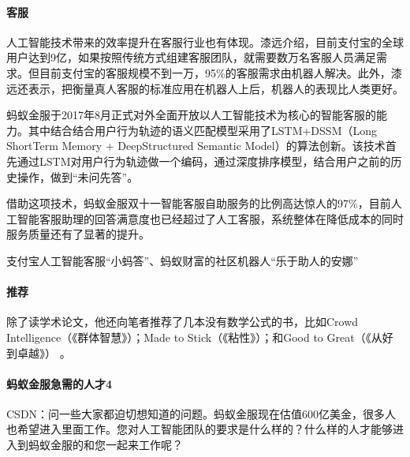\documentclass[letterpaper,11pt,english]{sphinxmanual}
\begin{document}
\paragraph{客服}
\label{\detokenize{chapter_AI_dive/qi_yuan:id6}}
人工智能技术带来的效率提升在客服行业也有体现。漆远介绍，目前支付宝的全球用户达到9亿，如果按照传统方式组建客服团队，就需要数万名客服人员满足需求。但目前支付宝的客服规模不到一万，95\%的客服需求由机器人解决。此外，漆远还表示，把衡量真人客服的标准应用在机器人上后，机器人的表现比人类更好。

蚂蚁金服于2017年8月正式对外全面开放以人工智能技术为核心的智能客服的能力。其中结合结合用户行为轨迹的语义匹配模型采用了LSTM+DSSM（Long
Short\sphinxhyphen{}Term Memory + DeepStructured Semantic
Model）的算法创新。该技术首先通过LSTM对用户行为轨迹做一个编码，通过深度排序模型，结合用户之前的历史操作，做到“未问先答”。

借助这项技术，蚂蚁金服双十一智能客服自助服务的比例高达惊人的97\%，目前人工智能客服助理的回答满意度也已经超过了人工客服，系统整体在降低成本的同时服务质量还有了显著的提升。

支付宝人工智能客服“小蚂答”、蚂蚁财富的社区机器人“乐于助人的安娜”%
\begin{footnote}[822]\sphinxAtStartFootnote
{}
%
\end{footnote}


\paragraph{推荐}
\label{\detokenize{chapter_AI_dive/qi_yuan:id7}}
除了读学术论文，他还向笔者推荐了几本没有数学公式的书，比如Crowd
Intelligence（《群体智慧》）；Made to Stick（《粘性》）；和Good to
Great（《从好到卓越》） 。


\paragraph{蚂蚁金服急需的人才4\sphinxfootnotemark[823]}
\label{\detokenize{chapter_AI_dive/qi_yuan:id8}}%
\begin{footnotetext}[823]\sphinxAtStartFootnote
{}
%
\end{footnotetext}\ignorespaces 
CSDN：问一些大家都迫切想知道的问题。蚂蚁金服现在估值600亿美金，很多人也希望进入里面工作。您对人工智能团队的要求是什么样的？什么样的人才能够进入到蚂蚁金服的和您一起来工作呢？
\end{document}
